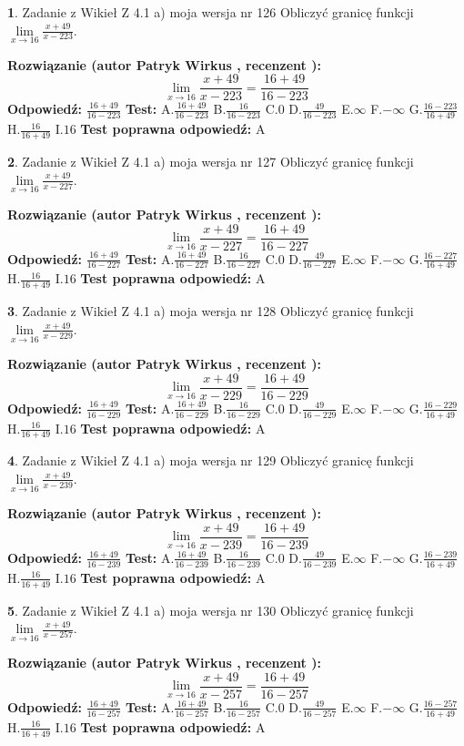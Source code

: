 \documentclass[12pt, a4paper]{article}
\theoremstyle{definition} %
\newtheorem{zad}{}
\newcommand{\zadStart}[1]{\begin{zad}#1\newline}
\newcommand{\zadStop}{\end{zad}}
\newcommand{\rozwStart}[2]{\noindent \textbf{Rozwiązanie (autor #1 , recenzent #2): }\newline}
\newcommand{\rozwStop}{\newline}
\newcommand{\odpStart}{\noindent \textbf{Odpowiedź:}\newline}
\newcommand{\odpStop}{\newline}
\newcommand{\testStart}{\noindent \textbf{Test:}\newline}
\newcommand{\testStop}{\newline}
\newcommand{\kluczStart}{\noindent \textbf{Test poprawna odpowiedź:}\newline}
\newcommand{\kluczStop}{\newline}
\begin{document}
\zadStart{Zadanie z Wikieł Z 4.1 a) moja wersja nr 126}
Obliczyć granicę funkcji $\lim\limits_{x\to16}\frac{x+49}{x-223}$.
\zadStop
\rozwStart{Patryk Wirkus}{}
$$\lim\limits_{x\to16}\frac{x+49}{x-223} = \frac{16+49}{16-223}$$
\rozwStop
\odpStart
$\frac{16+49}{16-223}$
\odpStop
\testStart
A.$\frac{16+49}{16-223}$
B.$\frac{16}{16-223}$
C.$0$
D.$\frac{49}{16-223}$
E.$\infty$
F.$-\infty$
G.$\frac{16-223}{16+49}$
H.$\frac{16}{16+49}$
I.$16$
\testStop
\kluczStart
A
\kluczStop



\zadStart{Zadanie z Wikieł Z 4.1 a) moja wersja nr 127}
Obliczyć granicę funkcji $\lim\limits_{x\to16}\frac{x+49}{x-227}$.
\zadStop
\rozwStart{Patryk Wirkus}{}
$$\lim\limits_{x\to16}\frac{x+49}{x-227} = \frac{16+49}{16-227}$$
\rozwStop
\odpStart
$\frac{16+49}{16-227}$
\odpStop
\testStart
A.$\frac{16+49}{16-227}$
B.$\frac{16}{16-227}$
C.$0$
D.$\frac{49}{16-227}$
E.$\infty$
F.$-\infty$
G.$\frac{16-227}{16+49}$
H.$\frac{16}{16+49}$
I.$16$
\testStop
\kluczStart
A
\kluczStop



\zadStart{Zadanie z Wikieł Z 4.1 a) moja wersja nr 128}
Obliczyć granicę funkcji $\lim\limits_{x\to16}\frac{x+49}{x-229}$.
\zadStop
\rozwStart{Patryk Wirkus}{}
$$\lim\limits_{x\to16}\frac{x+49}{x-229} = \frac{16+49}{16-229}$$
\rozwStop
\odpStart
$\frac{16+49}{16-229}$
\odpStop
\testStart
A.$\frac{16+49}{16-229}$
B.$\frac{16}{16-229}$
C.$0$
D.$\frac{49}{16-229}$
E.$\infty$
F.$-\infty$
G.$\frac{16-229}{16+49}$
H.$\frac{16}{16+49}$
I.$16$
\testStop
\kluczStart
A
\kluczStop



\zadStart{Zadanie z Wikieł Z 4.1 a) moja wersja nr 129}
Obliczyć granicę funkcji $\lim\limits_{x\to16}\frac{x+49}{x-239}$.
\zadStop
\rozwStart{Patryk Wirkus}{}
$$\lim\limits_{x\to16}\frac{x+49}{x-239} = \frac{16+49}{16-239}$$
\rozwStop
\odpStart
$\frac{16+49}{16-239}$
\odpStop
\testStart
A.$\frac{16+49}{16-239}$
B.$\frac{16}{16-239}$
C.$0$
D.$\frac{49}{16-239}$
E.$\infty$
F.$-\infty$
G.$\frac{16-239}{16+49}$
H.$\frac{16}{16+49}$
I.$16$
\testStop
\kluczStart
A
\kluczStop



\zadStart{Zadanie z Wikieł Z 4.1 a) moja wersja nr 130}
Obliczyć granicę funkcji $\lim\limits_{x\to16}\frac{x+49}{x-257}$.
\zadStop
\rozwStart{Patryk Wirkus}{}
$$\lim\limits_{x\to16}\frac{x+49}{x-257} = \frac{16+49}{16-257}$$
\rozwStop
\odpStart
$\frac{16+49}{16-257}$
\odpStop
\testStart
A.$\frac{16+49}{16-257}$
B.$\frac{16}{16-257}$
C.$0$
D.$\frac{49}{16-257}$
E.$\infty$
F.$-\infty$
G.$\frac{16-257}{16+49}$
H.$\frac{16}{16+49}$
I.$16$
\testStop
\kluczStart
A
\kluczStop
\end{document}
